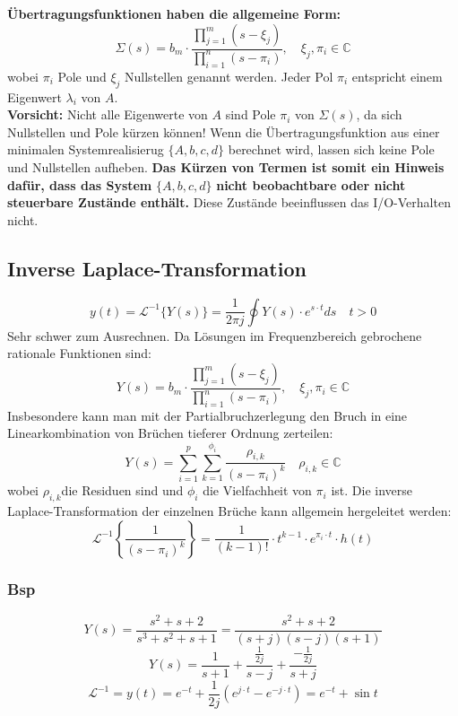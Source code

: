             \textbf{Übertragungsfunktionen haben die allgemeine Form:}
            \[\Sigma(s)=b_m\cdot\frac{\prod_{j=1}^{m}(s-\xi_j)}{\prod_{i=1}^{n}(s-\pi_i)}, \quad \xi_j,\pi_i \in \mathbb{C}\]
            wobei $\pi_i$ Pole und $\xi_j$ Nullstellen genannt werden. Jeder Pol $\pi_i$ entspricht einem Eigenwert $\lambda_i$ von $A$. 
            \\\textbf{Vorsicht:} Nicht alle Eigenwerte von $A$ sind Pole $\pi_i$ von $\Sigma(s)$, da sich Nullstellen und Pole kürzen können! Wenn die Übertragungsfunktion aus einer minimalen Systemrealisierug $\{A,b,c,d\}$ berechnet wird, lassen sich keine Pole und Nullstellen aufheben. \textbf{Das Kürzen von Termen ist somit ein Hinweis dafür, dass das System }$\{A,b,c,d\}$\textbf{ nicht beobachtbare oder nicht steuerbare Zustände enthält.} Diese Zustände beeinflussen das I/O-Verhalten nicht.
            
    
    \subsection{Inverse Laplace-Transformation}
        \[y(t)=\mathcal{L}^{-1}\{Y(s)\}=\frac{1}{2\pi j}\oint Y(s)\cdot e^{s\cdot t}ds \quad t>0\]
        Sehr schwer zum Ausrechnen. Da Lösungen im Frequenzbereich gebrochene rationale Funktionen sind:
        \[Y(s)=b_m\cdot\frac{\prod_{j=1}^{m}(s-\xi_j)}{\prod_{i=1}^{n}(s-\pi_i)}, \quad \xi_j,\pi_i \in \mathbb{C}\]
        Insbesondere kann man mit der Partialbruchzerlegung den Bruch in eine Linearkombination von Brüchen tieferer Ordnung zerteilen:
        \[Y(s)=\sum_{i=1}^{p}\sum_{k=1}^{\phi_i}\frac{\rho_{i,k}}{(s-\pi_i)^k} \quad \rho_{i,k}\in\mathbb{C}\]
        wobei $\rho_{i,k}$die Residuen sind und $\phi_i$ die Vielfachheit von $\pi_i$ ist. Die inverse Laplace-Transformation der einzelnen Brüche kann allgemein hergeleitet werden:
        \[\mathcal{L}^{-1}\left\{\frac{1}{(s-\pi_i)^k}\right\}=\frac{1}{(k-1)!}\cdot t^{k-1}\cdot e^{\pi_i\cdot t}\cdot h(t)\]
        
        \subsubsection{Bsp}
            \[Y(s)=\frac{s^2+s+2}{s^3+s^2+s+1}=\frac{s^2+s+2}{(s+j)(s-j)(s+1)}\]
            \[Y(s)= \frac{1}{s+1}+\frac{\frac{1}{2j}}{s-j}+\frac{-\frac{1}{2j}}{s+j}\]
            \[\mathcal{L}^{-1}=y(t)= e^{-t}+\frac{1}{2j}\left(e^{j\cdot t}-e^{-j\cdot t}\right)= e^{-t}+\sin{t}\]
    
